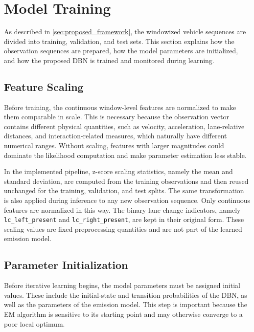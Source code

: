 \section{Model Training}
\label{sec:training_validation}
As described in \autoref{sec:proposed_framework}, the windowized vehicle sequences are divided into training, validation, and test sets. 
This section explains how the observation sequences are prepared, how the model parameters are initialized, 
and how the proposed \ac{DBN} is trained and monitored during learning.

\subsection{Feature Scaling}
Before training, the continuous window-level features are normalized to make them comparable in scale. 
This is necessary because the observation vector contains different physical quantities, such as velocity, 
acceleration, lane-relative distances, and interaction-related measures, which naturally have different numerical ranges. 
Without scaling, features with larger magnitudes could dominate the likelihood computation and make parameter estimation less stable.

\par In the implemented pipeline, z-score scaling statistics, namely the mean and standard deviation, are computed from the training observations and then reused unchanged 
for the training, validation, and test splits. 
The same transformation is also
applied during inference to any new observation sequence.   
Only continuous features are normalized in this way. The binary lane-change indicators, namely \texttt{lc\_left\_present} and \texttt{lc\_right\_present}, 
are kept in their original form.
These scaling values are fixed preprocessing quantities and are not part of the learned emission model. 




\subsection{Parameter Initialization}
\label{subsec:parin}
Before iterative learning begins, the model parameters must be assigned initial values. 
These include the initial-state and transition probabilities of the \ac{DBN}, as well as the parameters of the emission model. 
This step is important because the \ac{EM} algorithm is sensitive to its starting point and may otherwise converge to a poor local optimum. 


